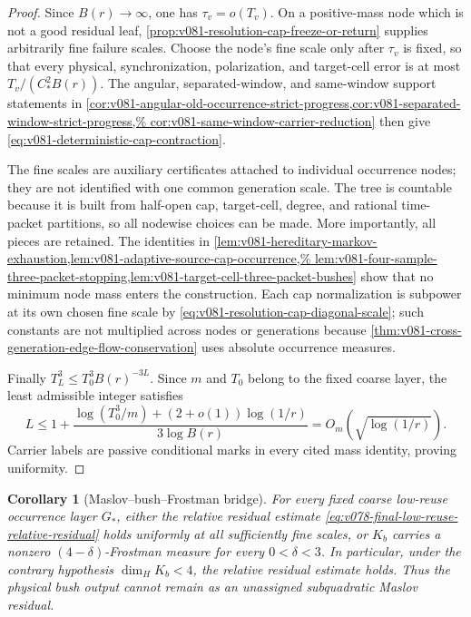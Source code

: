 \documentclass[10pt]{article}
\newtheorem{corollary}[theorem]{Corollary}
\begin{document}
\begin{proof}
Since \(B(r)\to\infty\), one has \(\tau_v=o(T_v)\).  On a positive-mass node which is not a good
residual leaf, \cref{prop:v081-resolution-cap-freeze-or-return} supplies arbitrarily fine failure
scales.  Choose the node's fine scale only after \(\tau_v\) is fixed, so that every physical,
synchronization, polarization, and target-cell error is at most
\(T_v/(C_*^2B(r))\).  The angular, separated-window, and same-window support statements in
\cref{cor:v081-angular-old-occurrence-strict-progress,cor:v081-separated-window-strict-progress,%
cor:v081-same-window-carrier-reduction} then give
\eqref{eq:v081-deterministic-cap-contraction}.

The fine scales are auxiliary certificates attached to individual occurrence nodes; they are not
identified with one common generation scale.  The tree is countable because it is built from
half-open cap, target-cell, degree, and rational time-packet partitions, so all nodewise choices can
be made.  More importantly, all pieces are retained.  The identities in
\cref{lem:v081-hereditary-markov-exhaustion,lem:v081-adaptive-source-cap-occurrence,%
lem:v081-four-sample-three-packet-stopping,lem:v081-target-cell-three-packet-bushes} show that no
minimum node mass enters the construction.  Each cap normalization is subpower at its own chosen
fine scale by \eqref{eq:v081-resolution-cap-diagonal-scale}; such constants are not multiplied
across nodes or generations because
\cref{thm:v081-cross-generation-edge-flow-conservation} uses absolute occurrence measures.

Finally \(T_L^3\le T_0^3B(r)^{-3L}\).  Since \(m\) and \(T_0\) belong to the fixed coarse layer,
the least admissible integer satisfies
\[
L\le
1+\frac{\log(T_0^3/m)+(2+o(1))\log(1/r)}{3\log B(r)}
=O_m\!\left(\sqrt{\log(1/r)}\right).
\]
Carrier labels are passive conditional marks in every cited mass identity, proving uniformity.
\end{proof}

\begin{corollary}[Maslov--bush--Frostman bridge]
\label{cor:v081-maslov-bush-frostman-bridge-closed}
For every fixed coarse low-reuse occurrence layer \(G_*\), either the relative residual estimate
\eqref{eq:v078-final-low-reuse-relative-residual} holds uniformly at all sufficiently fine scales,
or \(K_b\) carries a nonzero
\((4-\delta)\)-Frostman measure for every \(0<\delta<3\).  In particular, under the contrary
hypothesis \(\dim_HK_b<4\), the relative residual estimate holds.  Thus the physical bush output
cannot remain as an unassigned subquadratic Maslov residual.
\end{corollary}
\end{document}
